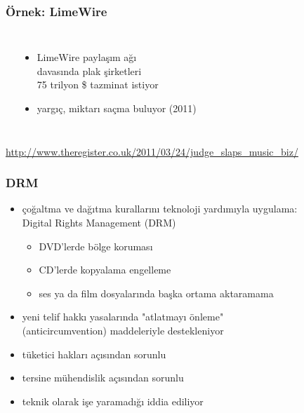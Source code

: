 \documentclass[dvipsnames]{beamer}
\theoremstyle{definition}
\theoremstyle{example}
\theoremstyle{plain}
\begin{document}
\begin{frame}
  \frametitle{Örnek: LimeWire}

  \begin{columns}
    \begin{center}
    \end{center}

    \begin{itemize}
      \item LimeWire paylaşım ağı\\
        davasında plak şirketleri\\
        75 trilyon \$ tazminat istiyor
      \item yargıç, miktarı saçma buluyor (2011)
    \end{itemize}
  \end{columns}

  \medskip
  \tiny{\url{http://www.theregister.co.uk/2011/03/24/judge_slaps_music_biz/}}\\
\end{frame}

\begin{frame}
  \frametitle{DRM}

  \begin{itemize}
    \item çoğaltma ve dağıtma kurallarını teknoloji yardımıyla uygulama:\\
      Digital Rights Management (DRM)
    \begin{itemize}
      \item DVD'lerde bölge koruması
      \item CD'lerde kopyalama engelleme
      \item ses ya da film dosyalarında başka ortama aktaramama
    \end{itemize}
    \item yeni telif hakkı yasalarında "atlatmayı önleme"\\
      (anticircumvention) maddeleriyle destekleniyor

    \pause
    \medskip
    \item tüketici hakları açısından sorunlu
    \item tersine mühendislik açısından sorunlu
    \item teknik olarak işe yaramadığı iddia ediliyor
  \end{itemize}
\end{frame}
\end{document}
